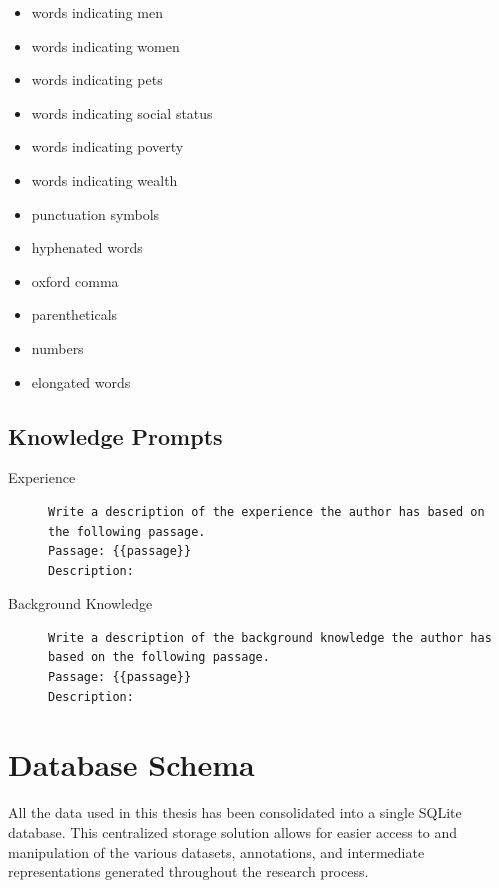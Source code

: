 \begin{multicols}{2}
\begin{itemize}[nolistsep]
    \item words indicating men
    \item words indicating women
    \item words indicating pets
    \item words indicating social status
    \item words indicating poverty
    \item words indicating wealth
    \item punctuation symbols
    \item hyphenated words
    \item oxford comma
    \item parentheticals
    \item numbers
    \item elongated words
  \end{itemize}
\end{multicols}

\subsection{Knowledge Prompts}
\label{sec:appendix:knowledgePrompts}
\begin{description}
  \item[Experience]\leavevmode \newline
        \begin{minipage}{\linewidth}
          \begin{lstlisting}
Write a description of the experience the author has based on the following passage.
Passage: {{passage}}
Description:
\end{lstlisting}
        \end{minipage}
  \item[Background Knowledge]\leavevmode \newline
        \begin{minipage}{\linewidth}
          \begin{lstlisting}
Write a description of the background knowledge the author has based on the following passage.
Passage: {{passage}}
Description:
\end{lstlisting}
        \end{minipage}
\end{description}

\section{Database Schema}
\label{sec:appendix:databaseSchema}
All the data used in this thesis has been consolidated into a single SQLite database. This centralized storage solution allows for easier access to and manipulation of the various datasets, annotations, and intermediate representations generated throughout the research process.

